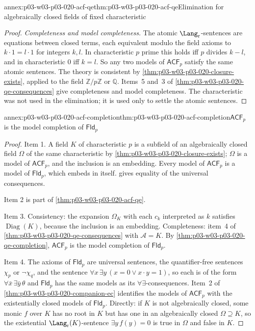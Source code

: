 \begin{annexitem}{annex:p03-w03-p03-020-acf-qe}{thm:p03-w03-p03-020-acf-qe}{Elimination for algebraically closed fields of fixed characteristic}
\begin{proof}
\emph{Completeness and model completeness.} The atomic
\(\Lang_{\mathrm r}\)-sentences are equations between closed terms, each
equivalent modulo the field axioms to \(k\cdot1=l\cdot1\) for integers
\(k,l\). In characteristic \(p\) prime this holds iff \(p\) divides \(k-l\),
and in characteristic \(0\) iff \(k=l\). So any two models of
\(\mathsf{ACF}_p\) satisfy the same atomic sentences. The theory is
consistent by \cref{thm:p03-w03-p03-020-closure-exists}, applied to the
field \(\mathbb Z/p\mathbb Z\) or \(\mathbb Q\). Items~5 and~3 of
\cref{thm:p03-w03-p03-020-qe-consequences} give completeness and model
completeness. The characteristic was not used in the elimination; it is
used only to settle the atomic sentences.
\end{proof}
\end{annexitem}

\begin{annexitem}{annex:p03-w03-p03-020-acf-completion}{thm:p03-w03-p03-020-acf-completion}{\(\mathsf{ACF}_p\) is the model completion of \(\mathsf{Fld}_p\)}
\begin{proof}
Item 1. A field \(K\) of characteristic \(p\) is a subfield of an
algebraically closed field \(\Omega\) of the same characteristic by
\cref{thm:p03-w03-p03-020-closure-exists}; \(\Omega\) is a model of
\(\mathsf{ACF}_p\), and the inclusion is an embedding. Every model of
\(\mathsf{ACF}_p\) is a model of \(\mathsf{Fld}_p\), which embeds in itself.
 gives equality of the
universal consequences.

Item 2 is part of \cref{thm:p03-w03-p03-020-acf-qe}.

Item 3. Consistency: the expansion \(\Omega_K\) with each \(c_k\)
interpreted as \(k\) satisfies \(\operatorname{Diag}(K)\), because the
inclusion is an embedding. Completeness: item~4 of
\cref{thm:p03-w03-p03-020-qe-consequences} with
\(\mathcal A=K\). By \cref{thm:p03-w03-p03-020-qe-completion},
\(\mathsf{ACF}_p\) is the model completion of \(\mathsf{Fld}_p\).

Item 4. The axioms of \(\mathsf{Fld}_p\) are universal sentences, the
quantifier-free sentences \(\chi_p\) or \(\neg\chi_q\), and the sentence
\(\forall x\,\exists y\,(x=0\lor x\cdot y=1)\), so each is of the form
\(\forall\bar x\,\exists\bar y\,\theta\) and \(\mathsf{Fld}_p\) has the same
models as its \(\forall\exists\)-consequences. Item~2 of
\cref{thm:p03-w03-p03-020-companion-ec} identifies the models of
\(\mathsf{ACF}_p\) with the existentially closed models of \(\mathsf{Fld}_p\).
Directly: if \(K\) is not algebraically closed, some monic \(f\) over \(K\)
has no root in \(K\) but has one in an algebraically closed
\(\Omega\supseteq K\), so the existential \(\Lang_{\mathrm r}(K)\)-sentence
\(\exists y\,f(y)=0\) is true in \(\Omega\) and false in \(K\).
\end{proof}
\end{annexitem}

